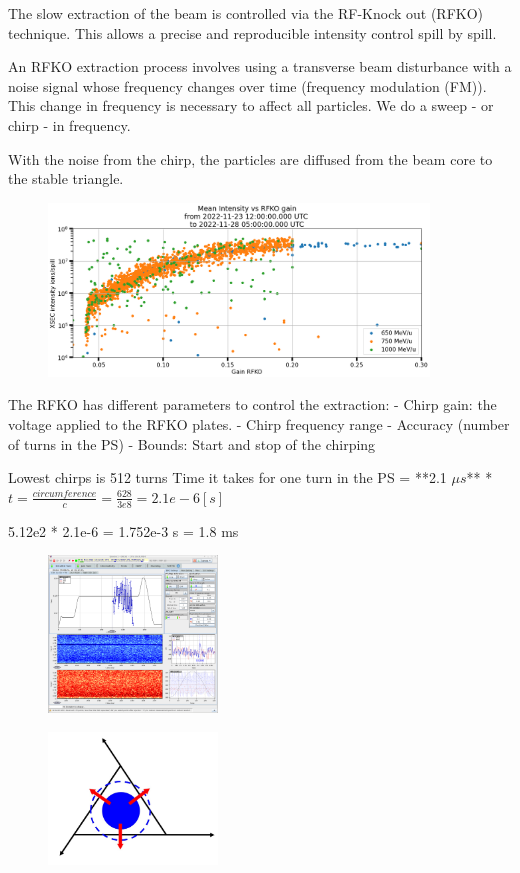 The slow extraction of the beam is controlled via the RF-Knock out (RFKO) technique. This allows a precise and reproducible intensity control spill by spill.

An RFKO extraction process involves using a transverse beam disturbance with a noise signal whose frequency changes over time (frequency modulation (FM)). This change in frequency is necessary to affect all particles. We do a sweep - or chirp - in frequency. 

With the noise from the chirp, the particles are diffused from the beam core to the stable triangle.

\begin{figure}[h]
\includegraphics[width=0.9\textwidth]{images/xsec70_intensity_vs_gain.png}
\end{figure}

The RFKO has different parameters to control the extraction:
- Chirp gain: the voltage applied to the RFKO plates.
- Chirp frequency range
- Accuracy (number of turns in the PS)
- Bounds: Start and stop of the chirping

Lowest chirps is 512 turns
Time it takes for one turn in the PS = **2.1 $\mu s$**
* $t = \frac{circumference}{c} = \frac{628}{3e8} = 2.1e-6 [s]$

5.12e2 * 2.1e-6 = 1.752e-3 s = 1.8 ms

\begin{figure}[h]
\includegraphics[width=0.4\textwidth]{images/qmeter.png}
\end{figure}

\begin{figure}[h]
\centering
\includegraphics[width=0.4\textwidth]{images/RFKO.jpg}
\end{figure}